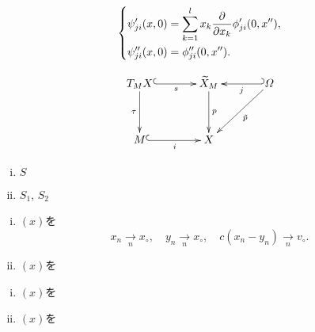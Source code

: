\begin{equation}
    \begin{dcases}
        \psi'_{ji}(x,0)=\sum_{k=1}^{l}x_k\frac{\partial}{\partial x_k}\phi'_{ji}(0,x''),\\
        \psi''_{ji}(x,0)=\phi''_{ji}(0,x'').
    \end{dcases}
\end{equation}

\begin{equation}
    \vcenter{\xymatrix@C=36pt@R=36pt{
    T_{M}X
    \ar[d]_-{\tau}
    \ar@{^{(}->}[r]_-{s}
    &
    \widetilde{X}_{M}
    \ar[d]^-{p}
    &
    \varOmega
    \ar[ld]^-{\tilde{p}}
    \ar@{_{(}->}[l]^-{j}
    \\
    M
    \ar@{^{(}->}[r]_-{i}
    &
    X
  }}
\end{equation}

\begin{DFN}
    \begin{enumerate}[(i)]
        \item \(S\)
        \item \(S_1\), \(S_2\)
    \end{enumerate}
\end{DFN}

\begin{leftbar}
\begin{PRP}
    \begin{enumerate}[(i)]
        \item \((x)\)を\begin{equation}
            x_n\underset{n}{\longrightarrow}x_{\circ},\quad
            y_n\underset{n}{\longrightarrow}x_{\circ},\quad
            c(x_n-y_n)\underset{n}{\longrightarrow}v_{\circ}.
        \end{equation}
        \item \((x)\)を
    \end{enumerate}
\end{PRP}
\end{leftbar}

\begin{leftbar}
\begin{PRP}
    \begin{enumerate}[(i)]
        \item \((x)\)を
        \item \((x)\)を
    \end{enumerate}
\end{PRP}
\end{leftbar}
    
